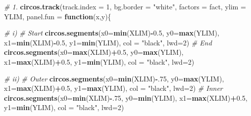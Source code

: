 \documentclass[
]{article}
\newenvironment{Shaded}{\begin{snugshade}}{\end{snugshade}}
\newcommand{\CommentTok}[1]{\textcolor[rgb]{0.56,0.35,0.01}{\textit{#1}}}
\newcommand{\ControlFlowTok}[1]{\textcolor[rgb]{0.13,0.29,0.53}{\textbf{#1}}}
\newcommand{\DataTypeTok}[1]{\textcolor[rgb]{0.13,0.29,0.53}{#1}}
\newcommand{\DecValTok}[1]{\textcolor[rgb]{0.00,0.00,0.81}{#1}}
\newcommand{\FloatTok}[1]{\textcolor[rgb]{0.00,0.00,0.81}{#1}}
\newcommand{\KeywordTok}[1]{\textcolor[rgb]{0.13,0.29,0.53}{\textbf{#1}}}
\newcommand{\NormalTok}[1]{#1}
\newcommand{\OperatorTok}[1]{\textcolor[rgb]{0.81,0.36,0.00}{\textbf{#1}}}
\newcommand{\StringTok}[1]{\textcolor[rgb]{0.31,0.60,0.02}{#1}}
\begin{document}
\begin{Shaded}
\begin{Highlighting}[]
\CommentTok{# 1.}
\KeywordTok{circos.track}\NormalTok{(}\DataTypeTok{track.index =} \DecValTok{1}\NormalTok{, }\DataTypeTok{bg.border =} \StringTok{"white"}\NormalTok{, }\DataTypeTok{factors =}\NormalTok{ fact, }\DataTypeTok{ylim =}\NormalTok{ YLIM, }\DataTypeTok{panel.fun =} \ControlFlowTok{function}\NormalTok{(x,y)\{}

\CommentTok{# i)}
\CommentTok{# Start }
\KeywordTok{circos.segments}\NormalTok{(}\DataTypeTok{x0=}\KeywordTok{min}\NormalTok{(XLIM)}\OperatorTok{-}\FloatTok{0.5}\NormalTok{, }\DataTypeTok{y0=}\KeywordTok{max}\NormalTok{(YLIM), }\DataTypeTok{x1=}\KeywordTok{min}\NormalTok{(XLIM)}\OperatorTok{-}\FloatTok{0.5}\NormalTok{, }\DataTypeTok{y1=}\KeywordTok{min}\NormalTok{(YLIM), }\DataTypeTok{col =} \StringTok{"black"}\NormalTok{, }\DataTypeTok{lwd=}\DecValTok{2}\NormalTok{)}
\CommentTok{# End }
\KeywordTok{circos.segments}\NormalTok{(}\DataTypeTok{x0=}\KeywordTok{max}\NormalTok{(XLIM)}\OperatorTok{+}\FloatTok{0.5}\NormalTok{, }\DataTypeTok{y0=}\KeywordTok{max}\NormalTok{(YLIM), }\DataTypeTok{x1=}\KeywordTok{max}\NormalTok{(XLIM)}\OperatorTok{+}\FloatTok{0.5}\NormalTok{, }\DataTypeTok{y1=}\KeywordTok{min}\NormalTok{(YLIM), }\DataTypeTok{col =} \StringTok{"black"}\NormalTok{, }\DataTypeTok{lwd=}\DecValTok{2}\NormalTok{)}

\CommentTok{# ii)}
\CommentTok{# Outer}
\KeywordTok{circos.segments}\NormalTok{(}\DataTypeTok{x0=}\KeywordTok{min}\NormalTok{(XLIM)}\OperatorTok{-}\NormalTok{.}\DecValTok{75}\NormalTok{, }\DataTypeTok{y0=}\KeywordTok{max}\NormalTok{(YLIM), }\DataTypeTok{x1=}\KeywordTok{max}\NormalTok{(XLIM)}\OperatorTok{+}\FloatTok{0.5}\NormalTok{, }\DataTypeTok{y1=}\KeywordTok{max}\NormalTok{(YLIM), }\DataTypeTok{col =} \StringTok{"black"}\NormalTok{, }\DataTypeTok{lwd=}\DecValTok{2}\NormalTok{)}
\CommentTok{# Inner}
\KeywordTok{circos.segments}\NormalTok{(}\DataTypeTok{x0=}\KeywordTok{min}\NormalTok{(XLIM)}\OperatorTok{-}\NormalTok{.}\DecValTok{75}\NormalTok{, }\DataTypeTok{y0=}\KeywordTok{min}\NormalTok{(YLIM), }\DataTypeTok{x1=}\KeywordTok{max}\NormalTok{(XLIM)}\OperatorTok{+}\FloatTok{0.5}\NormalTok{, }\DataTypeTok{y1=}\KeywordTok{min}\NormalTok{(YLIM), }\DataTypeTok{col =} \StringTok{"black"}\NormalTok{, }\DataTypeTok{lwd=}\DecValTok{2}\NormalTok{)}


\end{Highlighting}
\end{Shaded}
\end{document}
